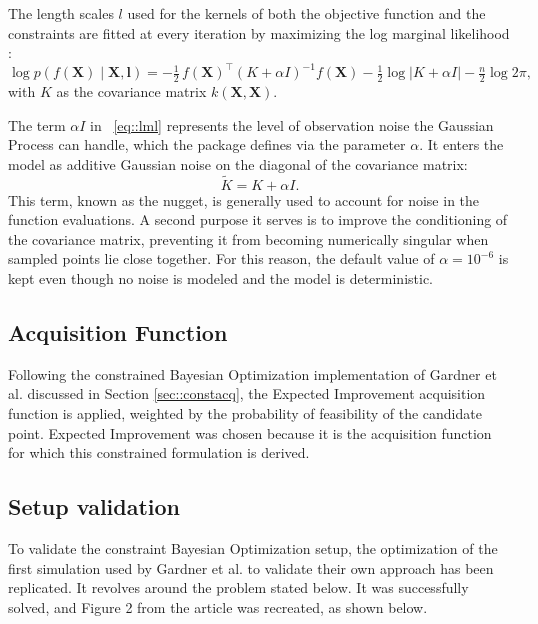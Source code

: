 The length scales $l$ used for the kernels of both the objective function and the constraints are fitted at every iteration by maximizing the log marginal likelihood \cite{rasmussen2006gaussian}:
\begin{equation}\label{eq::lml}
    \log p\!\left(f(\boldsymbol{X}) \mid \boldsymbol{X}, \boldsymbol{l}\right) = -\tfrac{1}{2}\, f(\boldsymbol{X})^{\top} \left( K + \alpha I \right)^{-1} f(\boldsymbol{X}) - \tfrac{1}{2} \log \left| K + \alpha I \right| - \tfrac{n}{2} \log 2\pi,
\end{equation}
with $K$ as the covariance matrix $k(\boldsymbol{X},\boldsymbol{X})$. 

The term $\alpha I$ in ~\eqref{eq::lml} represents the level of observation noise the Gaussian Process can handle, which the package defines via the parameter $\alpha$. It enters the model as additive Gaussian noise on the diagonal of the covariance matrix:
\begin{equation}\label{eq::nugget}
    \tilde{K} = K + \alpha I.
\end{equation}
This term, known as the nugget, is generally used to account for noise in the function evaluations. A second purpose it serves is to improve the conditioning of the covariance matrix, preventing it from becoming numerically singular when sampled points lie close together. For this reason, the default value of $\alpha = 10^{-6}$ is kept even though no noise is modeled and the model is deterministic. 

\subsection{Acquisition Function}
Following the constrained Bayesian Optimization implementation of Gardner et al. \cite{gardner2014bayesian} discussed in Section \ref{sec::constacq}, the Expected Improvement acquisition function is applied, weighted by the probability of feasibility of the candidate point. Expected Improvement was chosen because it is the acquisition function for which this constrained formulation is derived.

\subsection{Setup validation}
To validate the constraint Bayesian Optimization setup, the optimization of the first simulation used by Gardner et al. to validate their own approach has been replicated. It revolves around the problem stated below. It was successfully solved, and Figure 2 from the article was recreated, as shown below.

